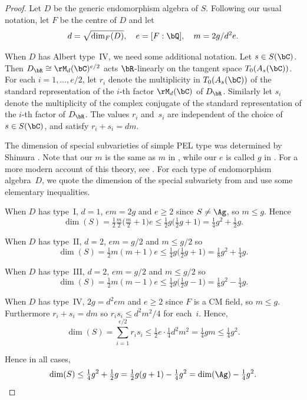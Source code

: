 \begin{proof}
Let $D$ be the generic endomorphism algebra of $S$. Following our usual notation, let $F$ be the centre of $D$ and let
\[
d = \sqrt{\dim_F(D)}, \quad e = [F:\bQ], \quad m = 2g/d^2e.
\]

When $D$ has Albert type~IV, we need some additional notation.
Let $s \in S(\bC)$.
Then $D_\bR \cong \rM_d(\bC)^{e/2}$ acts $\bR$-linearly on the tangent space $T_0(A_s(\bC))$.
For each $i = 1, \dotsc, e/2$, let $r_i$ denote the multiplicity in $T_0(A_s(\bC))$ of the standard representation of the $i$-th factor $\rM_d(\bC)$ of $D_\bR$.
Similarly let $s_i$ denote the multiplicity of the complex conjugate of the standard representation of the $i$-th factor of $D_\bR$.
The values $r_i$ and~$s_i$ are independent of the choice of $s \in S(\bC)$, and satisfy $r_i + s_i = dm$.

The dimension of special subvarieties of simple PEL type was determined by Shimura \cite[4.1]{Shi63}.
Note that our $m$ is the same as $m$ in \cite{Shi63}, while our $e$ is called $g$ in \cite{Shi63}.
For a more modern account of this theory, see \cite[Chap.\,9]{BL04}.
For each type of endomorphism algebra~$D$, we quote the dimension of the special subvariety from \cite[4.1]{Shi63} and use some elementary inequalities.

When $D$ has type~I, $d=1$, $em = 2g$ and $e \geq 2$ since $S \neq \Ag$, so $m \leq g$.
Hence
\[
\dim(S) = \tfrac{1}{2} \tfrac{m}{2} \bigl( \tfrac{m}{2} + 1 \bigr)e
\leq \tfrac{1}{2} g \bigl( \tfrac{1}{2}g + 1 \bigr) = \tfrac{1}{4}g^2 + \tfrac{1}{2}g.
\]

When $D$ has type~II, $d=2$, $em = g/2$ and $m \leq g/2$ so
\[
\dim(S) = \tfrac{1}{2} m(m+1)e
\leq \tfrac{1}{4}g \bigl( \tfrac{1}{2}g + 1 \bigr) = \tfrac{1}{8}g^2 + \tfrac{1}{4}g.
\]

When $D$ has type~III, $d=2$, $em = g/2$ and $m \leq g/2$ so
\[
\dim(S) = \tfrac{1}{2} m(m-1)e
\leq \tfrac{1}{4}g \bigl( \tfrac{1}{2}g - 1 \bigr) = \tfrac{1}{8}g^2 - \tfrac{1}{4}g.
\]

When $D$ has type~IV, $2g = d^2em$ and $e \geq 2$ since $F$ is a CM field, so $m \leq g$.
Furthermore $r_i + s_i = dm$ so $r_is_i \leq d^2m^2/4$ for each~$i$.
Hence,
\[
\dim(S) = \sum_{i=1}^{e/2} r_i s_i \leq \tfrac{1}{2}e \cdot \tfrac{1}{4}d^2m^2 = \tfrac{1}{4}gm \leq \tfrac{1}{4}g^2.
\]

Hence in all cases,
\[
\dim(S) \leq \tfrac{1}{4}g^2 + \tfrac{1}{2}g = \tfrac{1}{2}g(g+1) - \tfrac{1}{4}g^2 = \dim(\Ag) - \tfrac{1}{4}g^2.
\qedhere
\]
\end{proof}

